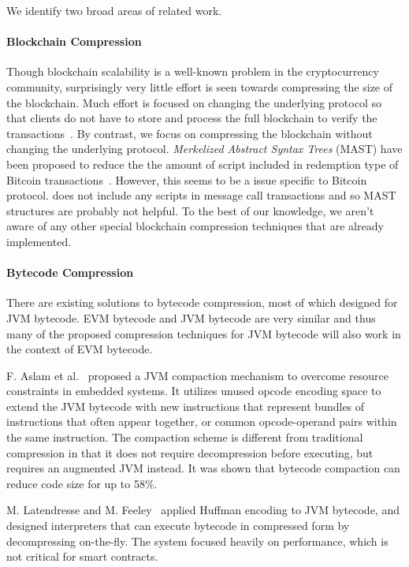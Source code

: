We identify two broad areas of related work.

\paragraph{Blockchain Compression}
Though blockchain scalability is a well-known problem in the cryptocurrency community,
surprisingly very little effort is seen towards compressing the size of the blockchain.
Much effort is focused on changing the underlying protocol so that clients
do not have to store and process the full blockchain to verify the transactions~\cite{lightclient, ultimate}.
By contrast, we focus on compressing the blockchain without changing the underlying protocol.
\emph{Merkelized Abstract Syntax Trees} (MAST) have been proposed to reduce the the amount of script included in redemption
type of Bitcoin transactions~\cite{mast}. 
However, this seems to be a issue specific to Bitcoin protocol.  
\eth{} does not include any scripts in message call transactions and so  MAST structures are probably not helpful.
To the best of our knowledge, we aren't aware of any other special blockchain compression techniques that are already implemented. 


\paragraph{Bytecode Compression}
There are existing solutions to bytecode compression, most of which designed for JVM bytecode.
EVM bytecode and JVM bytecode are very similar and thus many of the proposed compression techniques for JVM bytecode
will also work in the context of EVM bytecode.

F. Aslam et al.~\cite{aslam2010} proposed a JVM compaction mechanism to overcome resource constraints in embedded systems.
It utilizes unused opcode encoding space to extend the JVM bytecode with new instructions that represent bundles of
instructions that often appear together, or common opcode-operand pairs within the same instruction.
The compaction scheme is different from traditional compression in that it does not require decompression before executing,
but requires an augmented JVM instead. It was shown that bytecode compaction can reduce code size for up to 58\%.

M. Latendresse and M. Feeley~\cite{marc2003} applied Huffman encoding to JVM bytecode, and designed interpreters that
can execute bytecode in compressed form by decompressing on-the-fly.
The system focused heavily on performance, which is not critical for \eth{} smart contracts.

